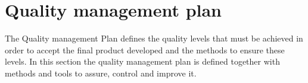 \chapter{Quality management plan}
The Quality management Plan defines the quality levels that must be achieved in order to accept the final product developed and the methods to ensure these levels. In this section the quality management plan is defined together with methods and tools to assure, control and improve it.



